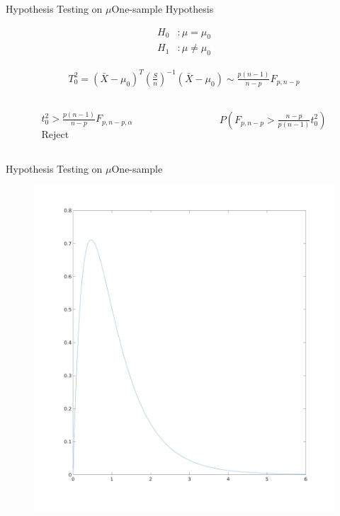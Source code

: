 \documentclass[aspectratio=169,10pt,t]{beamer}
\begin{document}
\begin{frame}{Hypothesis Testing on $\mu$}{One-sample}
	Hypothesis

	\begin{align*}
		H_0&: \mu = \mu_0\\
		H_1&: \mu \neq \mu_0
	\end{align*}

	\begin{align*}
		T^2_0 = ( \bar{X} - \mu_0)^{T} \left(\frac{S}{n}\right)^{-1} ( \bar{X} -\mu_0 ) \sim \frac{p(n-1)}{n-p} F_{p,n-p}
	\end{align*}

	\begin{columns}
		\begin{column}{0.5\textwidth}
			\begin{align*}
				t^2_0 > \frac{p(n-1)}{n-p} F_{p,n-p,\alpha } \\
				\text{Reject}
			\end{align*}
		\end{column}
		\begin{column}{0.5\textwidth}
			\begin{align*}
				P( F_{p,n-p} > \frac{n-p}{p(n-1)} t_0^2 )
			\end{align*}
		\end{column}
	\end{columns}



\end{frame}

\begin{frame}{Hypothesis Testing on $\mu$}{One-sample}
	\begin{figure}[H]
		\centering
		\includegraphics[scale=0.15]{images/f.png}
	\end{figure} 
\end{frame}
\end{document}
